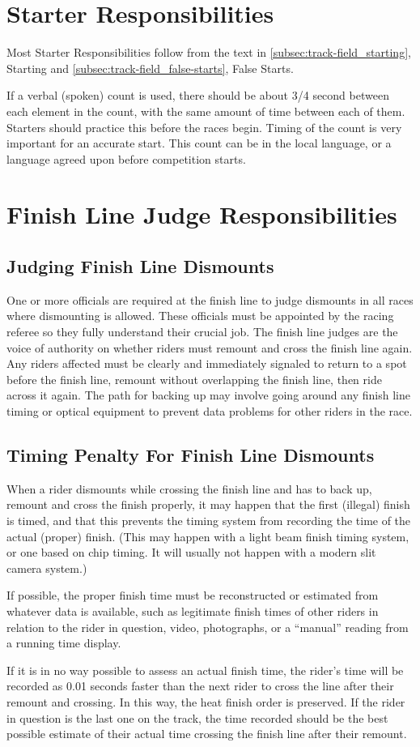 \section{Starter Responsibilities\label{sec:track_starter}}

Most Starter Responsibilities follow from the text in \ref{subsec:track-field_starting}, Starting and \ref{subsec:track-field_false-starts}, False Starts.

If a verbal (spoken) count is used, there should be about 3/4 second between each element in the count, with the same amount of time between each of them.
Starters should practice this before the races begin.
Timing of the count is very important for an accurate start.
This count can be in the local language, or a language agreed upon before competition starts.

\section{Finish Line Judge Responsibilities}

\subsection{Judging Finish Line Dismounts}
One or more officials are required at the finish line to judge dismounts in all races where dismounting is allowed.
These officials must be appointed by the racing referee so they fully understand their crucial job.
The finish line judges are the voice of authority on whether riders must remount and cross the finish line again.
Any riders affected must be clearly and immediately signaled to return to a spot before the finish line, remount without overlapping the finish line, then ride across it again.
The path for backing up may involve going around any finish line timing or optical equipment to prevent data problems for other riders in the race.

\subsection{Timing Penalty For Finish Line Dismounts}
When a rider dismounts while crossing the finish line and has to back up, remount and cross the finish properly, it may happen that the first (illegal) finish is timed, and that this prevents the timing system from recording the time of the actual (proper) finish.
(This may happen with a light beam finish timing system, or one based on chip timing.
It will usually not happen with a modern slit camera system.)

If possible, the proper finish time must be reconstructed or estimated from whatever data is available, such as legitimate finish times of other riders in relation to the rider in question, video, photographs, or a ``manual'' reading from a running time display.

If it is in no way possible to assess an actual finish time, the rider’s time will be recorded as 0.01 seconds faster than the next rider to cross the line after their remount and crossing.
In this way, the heat finish order is preserved.
If the rider in question is the last one on the track, the time recorded should be the best possible estimate of their actual time crossing the finish line after their remount.
